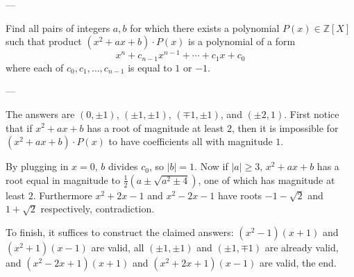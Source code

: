 
---

Find all pairs of integers $a,b$ for which there exists a polynomial $P(x)\in\mathbb Z[X]$ such that product $(x^2+ax+b)\cdot P(x)$ is a polynomial of a form \[x^n+c_{n-1}x^{n-1}+\cdots+c_1x+c_0 \]
where each of $c_0,c_1,\ldots,c_{n-1}$ is equal to $1$ or $-1$.

---

The answers are $(0,\pm1)$, $(\pm1,\pm1)$, $(\mp1,\pm1)$, and $(\pm2,1)$. First notice that if $x^2+ax+b$ has a root of magnitude at least $2$, then it is impossible for $(x^2+ax+b)\cdot P(x)$ to have coefficients all with magnitude $1$.

By plugging in $x=0$, $b$ divides $c_0$, so $|b|=1$. Now if $|a|\ge3$, $x^2+ax+b$ has a root equal in magnitude to $\frac12(a\pm\sqrt{a^2\pm4})$, one of which has magnitude at least $2$. Furthermore $x^2+2x-1$ and $x^2-2x-1$ have roots $-1-\sqrt2$ and $1+\sqrt2$ respectively, contradiction.

To finish, it suffices to construct the claimed answers: $(x^2-1)(x+1)$ and $(x^2+1)(x-1)$ are valid, all $(\pm1,\pm1)$ and $(\pm1,\mp1)$ are already valid, and $(x^2-2x+1)(x+1)$ and $(x^2+2x+1)(x-1)$ are valid, the end.

